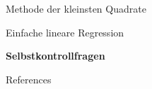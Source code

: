 \documentclass[
  8pt,
  ignorenonframetext,
]{beamer}
\begin{document}
\begin{frame}{}
\protect\hypertarget{section-5}{}
\vfill
\large

Methode der kleinsten Quadrate

Einfache lineare Regression

\textbf{Selbstkontrollfragen}

\vfill
\end{frame}

\begin{frame}{References}
\protect\hypertarget{references}{}
\footnotesize
\end{frame}
\end{document}

